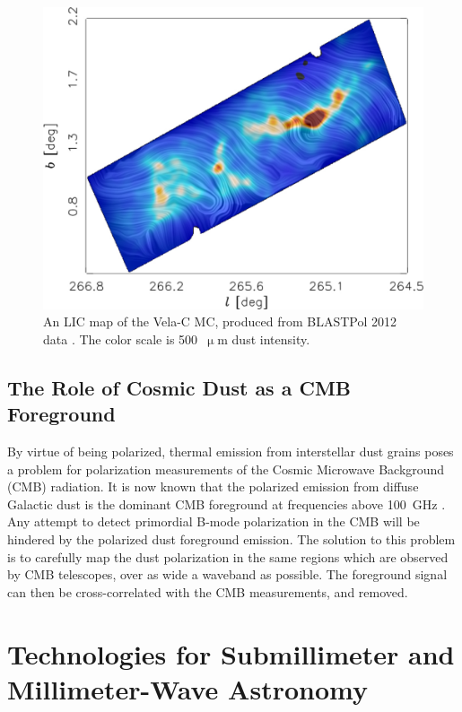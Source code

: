 \begin{figure}[!htbp]
\centering
\includegraphics[width=\textwidth]{figures/intro/velac_lic}
\caption[~An LIC map of Vela-C, from BLASTPol 2012 data.]{An LIC map of the Vela-C MC, produced from BLASTPol 2012 data \citep{fissel2016balloon}. The color scale is 500~$\upmu$m dust intensity.}
\label{fig:vela2012}
\end{figure}

\subsection{The Role of Cosmic Dust as a CMB Foreground}

By virtue of being polarized, thermal emission from interstellar dust grains poses a problem for polarization measurements of the Cosmic Microwave Background (CMB) radiation. It is now known that the polarized emission from diffuse Galactic dust is the dominant CMB foreground at frequencies above 100~GHz \citep{adam2016planck}. Any attempt to detect primordial B-mode polarization in the CMB will be hindered by the polarized dust foreground emission. The solution to this problem is to carefully map the dust polarization in the same regions which are observed by CMB telescopes, over as wide a waveband as possible. The foreground signal can then be cross-correlated with the CMB measurements, and removed.

\section{Technologies for Submillimeter and Millimeter-Wave Astronomy}

